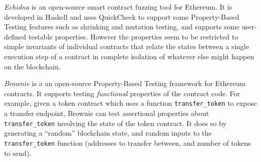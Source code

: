 \documentclass[twoside,11pt,openright]{report}
\newcommand{\pbt}{Property-Based Testing}
\newcommand{\coq}[1]{\texttt{#1}}
\begin{document}
\textit{Echidna} is an open-source smart contract fuzzing tool for Ethereum\cite{echidna}. It is developed in Haskell and uses QuickCheck to support some \pbt{} features such as shrinking and mutation testing, and supports some user-defined testable properties. However the properties seem to be restricted to simple invariants of individual contracts that relate the states between a single execution step of a contract in complete isolation of whatever else might happen on the blockchain.

\textit{Brownie} is a an open-source \pbt{} framework for Ethereum contracts\cite{brownie}. It supports testing \textit{functional} properties of the contract code. For example, given a token contract which uses a function \coq{transfer\_token} to expose a transfer endpoint, Brownie can test assertional properties about \coq{transfer\_token} involving the state of the token contract. It does so by generating a ``random'' blockchain state, and random inputs to the \coq{transfer\_token} function (addresses to transfer between, and number of tokens to send).
\end{document}
